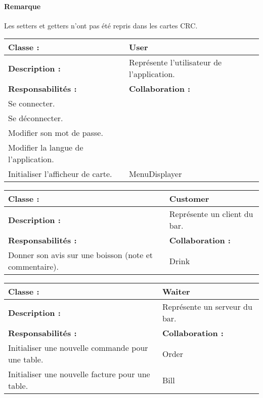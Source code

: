 

\paragraph{Remarque} Les setters et getters
n'ont pas été repris dans les cartes CRC.

\begin{center}

\begin{tabular}{|p{6cm}p{6cm}|}
	\hline
		\textbf{Classe :} & User \\
	\hline
		\textbf{Description :} & Représente l'utilisateur de l'application. \\
	\hline
		\textbf{Responsabilités :} & \textbf{Collaboration :} \\
		Se connecter. & \\
		Se déconnecter. & \\
		Modifier son mot de passe. & \\
		Modifier la langue de l'application. & \\
		Initialiser l'afficheur de carte. & MenuDisplayer \\
	\hline		
\end{tabular}

\vspace{0.5cm}

\begin{tabular}{|p{6cm}p{6cm}|}
	\hline
		\textbf{Classe :} & Customer \\
	\hline
		\textbf{Description :} & Représente un client du bar. \\
	\hline
		\textbf{Responsabilités :} & \textbf{Collaboration :} \\
		Donner son avis sur une boisson (note et commentaire). & Drink \\
	\hline		
\end{tabular}

\vspace{0.5cm}

\begin{tabular}{|p{6cm}p{6cm}|}
	\hline
		\textbf{Classe :} & Waiter \\
	\hline
		\textbf{Description :} & Représente un serveur du bar. \\
	\hline
		\textbf{Responsabilités :} & \textbf{Collaboration :} \\
		Initialiser une nouvelle commande pour une table. & Order \\
		Initialiser une nouvelle facture pour une table. & Bill \\
	\hline		
\end{tabular}


\end{center}
